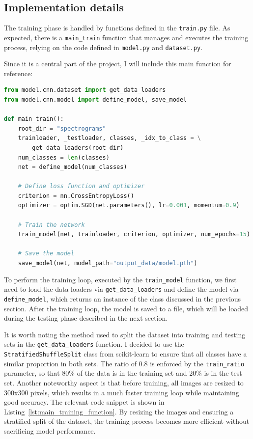 \documentclass[12pt]{article}
\begin{document}
\subsection{Implementation details}

The training phase is handled by functions defined in the \texttt{train.py} file. As expected, there is a \texttt{main\_train} function that manages and executes the training process, relying on the code defined in \texttt{model.py} and \texttt{dataset.py}.

Since it is a central part of the project, I will include this main function for reference:

\begin{lstlisting}[language=Python, caption=Main Training Function]
from model.cnn.dataset import get_data_loaders
from model.cnn.model import define_model, save_model

def main_train():
    root_dir = "spectrograms"
    trainloader, _testloader, classes, _idx_to_class = \
        get_data_loaders(root_dir)
    num_classes = len(classes)
    net = define_model(num_classes)

    # Define loss function and optimizer
    criterion = nn.CrossEntropyLoss()
    optimizer = optim.SGD(net.parameters(), lr=0.001, momentum=0.9)

    # Train the network
    train_model(net, trainloader, criterion, optimizer, num_epochs=15)

    # Save the model
    save_model(net, model_path="output_data/model.pth")
\end{lstlisting}

To perform the training loop, executed by the \texttt{train\_model} function, we first need to load the data loaders via \texttt{get\_data\_loaders} and define the model via \texttt{define\_model}, which returns an instance of the class discussed in the previous section. After the training loop, the model is saved to a file, which will be loaded during the testing phase described in the next section.

It is worth noting the method used to split the dataset into training and testing sets in the \texttt{get\_data\_loaders} function. I decided to use the \texttt{StratifiedShuffleSplit} class from scikit-learn to ensure that all classes have a similar proportion in both sets. The ratio of 0.8 is enforced by the \texttt{train\_ratio} parameter, so that 80\% of the data is in the training set and 20\% is in the test set. Another noteworthy aspect is that before training, all images are resized to 300x300 pixels, which results in a much faster training loop while maintaining good accuracy. The relevant code snippet is shown in Listing~\ref{lst:main_training_function}.
By resizing the images and ensuring a stratified split of the dataset, the training process becomes more efficient without sacrificing model performance.
\end{document}
